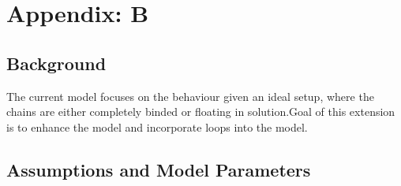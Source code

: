 \documentclass[10pt,letterpaper]{article}
\begin{document}
\section{Appendix: B}

\subsection{Background}
The current model focuses on the behaviour given an ideal setup, where the chains are either completely binded or floating in solution.Goal of this extension is to enhance the model and incorporate loops into the model.
 
\subsection{Assumptions and Model Parameters}
\textbf{}\\
\end{document}
